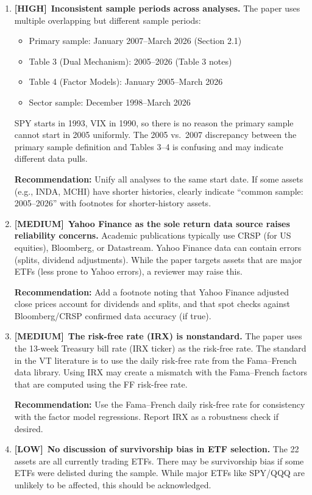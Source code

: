 \documentclass[12pt,a4paper]{article}
\newcommand{\HIGH}{\textcolor{highsev}{\textbf{[HIGH]}}}
\newcommand{\MEDIUM}{\textcolor{medsev}{\textbf{[MEDIUM]}}}
\newcommand{\LOW}{\textcolor{lowsev}{\textbf{[LOW]}}}
\begin{document}
\begin{enumerate}[label=\textbf{8.\arabic*}]

\item \HIGH\ \textbf{Inconsistent sample periods across analyses.}
The paper uses multiple overlapping but different sample periods:
\begin{itemize}
\item Primary sample: January 2007--March 2026 (Section 2.1)
\item Table 3 (Dual Mechanism): 2005--2026 (Table 3 notes)
\item Table 4 (Factor Models): January 2005--March 2026
\item Sector sample: December 1998--March 2026
\end{itemize}
SPY starts in 1993, VIX in 1990, so there is no reason the primary sample cannot start in 2005 uniformly. The 2005 vs.\ 2007 discrepancy between the primary sample definition and Tables 3--4 is confusing and may indicate different data pulls.

\textbf{Recommendation:} Unify all analyses to the same start date. If some assets (e.g., INDA, MCHI) have shorter histories, clearly indicate ``common sample: 2005--2026'' with footnotes for shorter-history assets.

\item \MEDIUM\ \textbf{Yahoo Finance as the sole return data source raises reliability concerns.}
Academic publications typically use CRSP (for US equities), Bloomberg, or Datastream. Yahoo Finance data can contain errors (splits, dividend adjustments). While the paper targets assets that are major ETFs (less prone to Yahoo errors), a reviewer may raise this.

\textbf{Recommendation:} Add a footnote noting that Yahoo Finance adjusted close prices account for dividends and splits, and that spot checks against Bloomberg/CRSP confirmed data accuracy (if true).

\item \MEDIUM\ \textbf{The risk-free rate (IRX) is nonstandard.}
The paper uses the 13-week Treasury bill rate (IRX ticker) as the risk-free rate. The standard in the VT literature is to use the daily risk-free rate from the Fama--French data library. Using IRX may create a mismatch with the Fama--French factors that are computed using the FF risk-free rate.

\textbf{Recommendation:} Use the Fama--French daily risk-free rate for consistency with the factor model regressions. Report IRX as a robustness check if desired.

\item \LOW\ \textbf{No discussion of survivorship bias in ETF selection.}
The 22 assets are all currently trading ETFs. There may be survivorship bias if some ETFs were delisted during the sample. While major ETFs like SPY/QQQ are unlikely to be affected, this should be acknowledged.

\end{enumerate}
\end{document}

